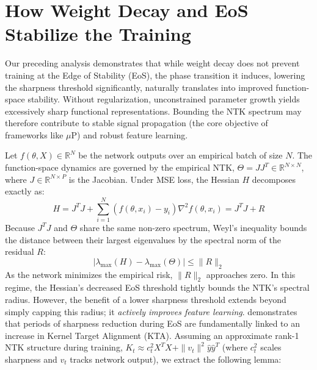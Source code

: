 \documentclass{article}
\begin{document}
\section{How Weight Decay and EoS Stabilize the Training}
\label{sec:ntk}

Our preceding analysis demonstrates that while weight decay does not prevent training at the Edge of Stability (EoS), the phase transition it induces, lowering the sharpness threshold significantly, naturally translates into improved function-space stability. Without regularization, unconstrained parameter growth yields excessively sharp functional representations. Bounding the NTK spectrum may therefore contribute to stable signal propagation (the core objective of frameworks like $\mu$P) and robust feature learning.

Let $f(\theta, X) \in \mathbb{R}^N$ be the network outputs over an empirical batch of size $N$. The function-space dynamics are governed by the empirical NTK, $\Theta = J J^T \in \mathbb{R}^{N \times N}$, where $J \in \mathbb{R}^{N \times P}$ is the Jacobian. Under MSE loss, the Hessian $H$ decomposes exactly as:
\begin{equation}
    H = J^T J + \sum_{i=1}^N (f(\theta, x_i) - y_i)\nabla^2 f(\theta, x_i) = J^TJ + R
\end{equation}
Because $J^TJ$ and $\Theta$ share the same non-zero spectrum, Weyl's inequality bounds the distance between their largest eigenvalues by the spectral norm of the residual $R$:
\begin{equation}
\label{eq:ntk_eos_bound}
    |\lambda_{\max}(H) - \lambda_{\max}(\Theta)| \le \|R\|_2
\end{equation}
As the network minimizes the empirical risk, $\|R\|_2$ approaches zero. In this regime, the Hessian's decreased EoS threshold tightly bounds the NTK's spectral radius. However, the benefit of a lower sharpness threshold extends beyond simply capping this radius; it \emph{actively improves feature learning}. \citep{ntk_eos} demonstrates that periods of sharpness reduction during EoS are fundamentally linked to an increase in Kernel Target Alignment (KTA). Assuming an approximate rank-1 NTK structure during training, $K_t \approx c_t^2 X^T X + \|v_t\|^2 \hat{y}\hat{y}^T$ (where $c_t^2$ scales sharpness and $v_t$ tracks network output), we extract the following lemma:
\end{document}
